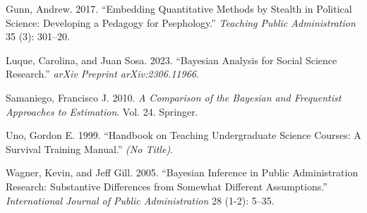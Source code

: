 \documentclass[
  12pt,
  letterpaper,
  DIV=11,
  numbers=noendperiod]{scrartcl}
\newlength{\cslhangindent}
\newlength{\cslentryspacingunit} %
\newenvironment{CSLReferences}[2] %
 {%
  \setlength{\parindent}{0pt}
  \ifodd #1
  \let\oldpar\par
  \def\par{\hangindent=\cslhangindent\oldpar}
  \fi
  \setlength{\parskip}{#2\cslentryspacingunit}
 }%
 {}
\begin{document}
\begin{CSLReferences}{1}{0}
\leavevmode{}%
Gunn, Andrew. 2017. {``Embedding Quantitative Methods by Stealth in
Political Science: Developing a Pedagogy for Psephology.''}
\emph{Teaching Public Administration} 35 (3): 301--20.

\leavevmode{}%
Luque, Carolina, and Juan Sosa. 2023. {``Bayesian Analysis for Social
Science Research.''} \emph{arXiv Preprint arXiv:2306.11966}.

\leavevmode{}%
Samaniego, Francisco J. 2010. \emph{A Comparison of the Bayesian and
Frequentist Approaches to Estimation}. Vol. 24. Springer.

\leavevmode{}%
Uno, Gordon E. 1999. {``Handbook on Teaching Undergraduate Science
Courses: A Survival Training Manual.''} \emph{(No Title)}.

\leavevmode{}%
Wagner, Kevin, and Jeff Gill. 2005. {``Bayesian Inference in Public
Administration Research: Substantive Differences from Somewhat Different
Assumptions.''} \emph{International Journal of Public Administration} 28
(1-2): 5--35.

\end{CSLReferences}
\end{document}
